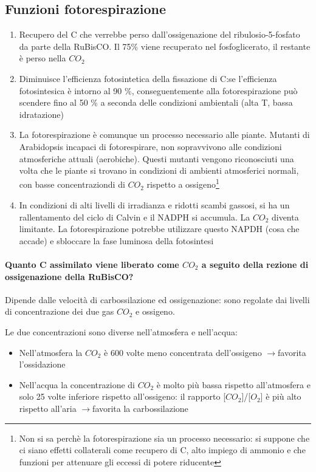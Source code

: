 \documentclass[a4paper,12pt]{book}
\newcommand{\lfreccia}{\ensuremath{\longrightarrow}}
\begin{document}
 
\subsection{Funzioni fotorespirazione} 
\begin{enumerate}
\item{Recupero del C che verrebbe perso dall'ossigenazione del ribulosio-5-fosfato da parte della RuBisCO. Il 75\% viene recuperato nel fosfoglicerato, il restante è perso nella $CO_{2}$}

\item{Diminuisce l'efficienza fotosintetica della fissazione di C:se l'efficienza fotosintesica è intorno al 90 \%, conseguentemente alla fotorespirazione può scendere fino al 50 \% a seconda delle condizioni ambientali (alta T, bassa idratazione)}

\item{La fotorespirazione è comunque un processo necessario alle piante. Mutanti di Arabidopsis incapaci di fotorespirare, non sopravvivono alle condizioni atmosferiche attuali (aerobiche). Questi mutanti vengono riconosciuti una volta che le piante si trovano in condizioni di ambienti atmosferici normali, con basse concentraziondi di  $CO_{2}$ rispetto a ossigeno\footnote{Non si sa perchè la fotorespirazione sia un processo necessario: si suppone che ci siano effetti collaterali come recupero di C, alto impiego di ammonio e che funzioni per attenuare gli eccessi di potere riducente}}
\item{In condizioni di alti livelli di irradianza e ridotti scambi gassosi, si ha un rallentamento del ciclo di Calvin e il NADPH si accumula. La $CO_{2}$ diventa limitante. La fotorespirazione potrebbe utilizzare questo NAPDH (cosa che accade) e sbloccare la fase luminosa della fotosintesi}
\end{enumerate} 

\paragraph{Quanto C assimilato viene liberato come $CO_{2}$ a seguito della rezione di ossigenazione della RuBisCO?}
Dipende dalle velocità di carbossilazione ed ossigenazione: sono regolate dai livelli di concentrazione dei due gas $CO_{2}$ e ossigeno. 

Le due concentrazioni sono diverse nell'atmosfera e nell'acqua:
\begin{itemize}
\item{Nell'atmosfera la $CO_{2}$ è 600 volte meno concentrata dell'ossigeno \lfreccia favorita l'ossidazione} \item{Nell'acqua la concentrazione di $CO_{2}$ è molto più bassa rispetto all'atmosfera e solo 25 volte inferiore rispetto all'ossigeno: il rapporto [$CO_{2}$]/[$O_{2}$] è più alto rispetto all'aria \lfreccia favorita la carbossilazione}
\end{itemize}
\end{document}
